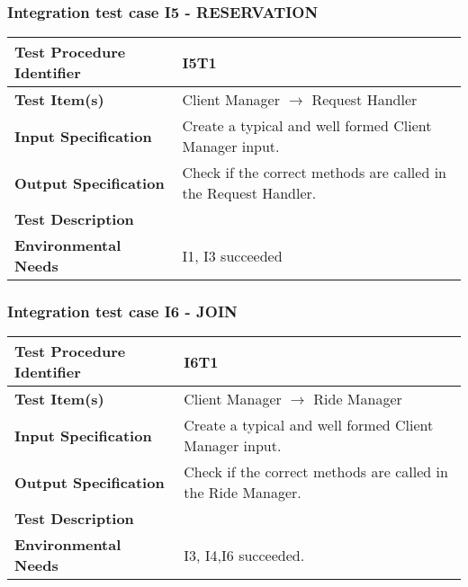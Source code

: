 \subsubsection{Integration test case I5 - RESERVATION }
 \begin{tabular}{l p{}}
    \hline
    \textbf{Test Procedure Identifier} & I5T1\\
    \hline
    \textbf{Test Item(s)} & Client Manager  $\rightarrow$ Request Handler \\
    \hline
    \textbf{Input Specification} &  Create a typical and well formed Client Manager input.  \\
    \hline
    \textbf{Output Specification} & Check if the correct methods are called in the Request Handler.  \\
    \hline
    \textbf{Test Description} & \\
    \hline
    \textbf{Environmental Needs} &  I1, I3 succeeded\\
    \hline
    \end{tabular}
\hfill \newline \newline  
\subsubsection{Integration test case I6 - JOIN } 
\begin{tabular}{l p{}}
    \hline
    \textbf{Test Procedure Identifier} & I6T1 \\
    \hline
    \textbf{Test Item(s)} & Client Manager $\rightarrow$ Ride Manager \\
    \hline
    \textbf{Input Specification} &  Create a typical and well formed Client Manager input.   \\
    \hline
    \textbf{Output Specification} & Check if the correct methods are called in the Ride Manager.\\
    \hline
    \textbf{Test Description} & \\
    \hline
    \textbf{Environmental Needs} &  I3, I4,I6 succeeded.\\
    \hline
\end{tabular}
\hfill \newline \newline 
